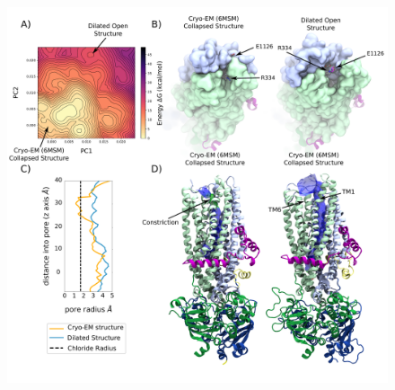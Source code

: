 \begin{figure}
	\begin{center}
		\includegraphics[width=1\textwidth]{figures/opening/summary_dilated_structure_1.pdf}
	\end{center}
	\captionsetup{singlelinecheck = false, justification=raggedright}

\end{figure}
